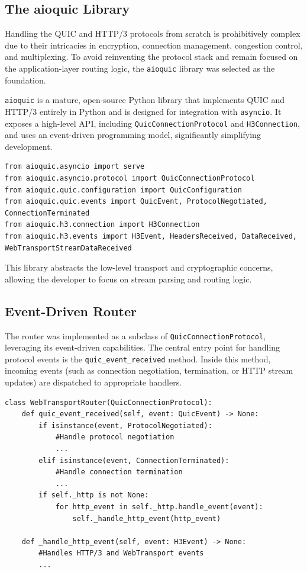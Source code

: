 \subsection{The aioquic Library}

Handling the QUIC and HTTP/3 protocols from scratch is prohibitively complex due to their intricacies in encryption, connection management, congestion control, and multiplexing. To avoid reinventing the protocol stack and remain focused on the application-layer routing logic, the \texttt{aioquic} library was selected as the foundation.

\texttt{aioquic} is a mature, open-source Python library that implements QUIC and HTTP/3 entirely in Python and is designed for integration with \texttt{asyncio}. It exposes a high-level API, including \texttt{QuicConnectionProtocol} and \texttt{H3Connection}, and uses an event-driven programming model, significantly simplifying development.

\begin{lstlisting}[breaklines=true,basicstyle=\small\ttfamily,frame=single]
from aioquic.asyncio import serve
from aioquic.asyncio.protocol import QuicConnectionProtocol
from aioquic.quic.configuration import QuicConfiguration
from aioquic.quic.events import QuicEvent, ProtocolNegotiated, ConnectionTerminated
from aioquic.h3.connection import H3Connection
from aioquic.h3.events import H3Event, HeadersReceived, DataReceived, WebTransportStreamDataReceived
\end{lstlisting}

This library abstracts the low-level transport and cryptographic concerns, allowing the developer to focus on stream parsing and routing logic.

\subsection{Event-Driven Router}

The router was implemented as a subclass of \texttt{QuicConnectionProtocol}, leveraging its event-driven capabilities. The central entry point for handling protocol events is the \texttt{quic\_event\_received} method. Inside this method, incoming events (such as connection negotiation, termination, or HTTP stream updates) are dispatched to appropriate handlers.

\begin{lstlisting}[breaklines=true,basicstyle=\small\ttfamily,frame=single]
class WebTransportRouter(QuicConnectionProtocol):
    def quic_event_received(self, event: QuicEvent) -> None:
        if isinstance(event, ProtocolNegotiated):
            #Handle protocol negotiation
            ...
        elif isinstance(event, ConnectionTerminated):
            #Handle connection termination
            ...
        if self._http is not None:
            for http_event in self._http.handle_event(event):
                self._handle_http_event(http_event)

    def _handle_http_event(self, event: H3Event) -> None:
        #Handles HTTP/3 and WebTransport events
        ...
\end{lstlisting}


